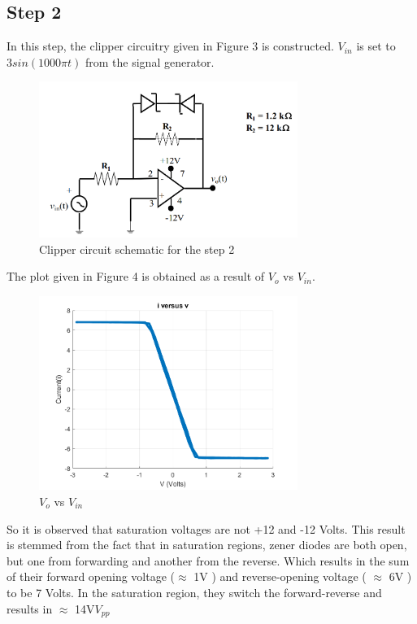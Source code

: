 \documentclass[letterpaper,12pt]{article}
\begin{document}
\subsection{Step 2}
In this step, the clipper circuitry given in Figure 3 is constructed. \(V_{in}\) is set to \(3 sin (1000\pi t)\) from the signal generator.
\begin{figure}[H]
    \centering
    \includegraphics[width = 0.75\textwidth]{2SCH.png}
    \caption{Clipper circuit schematic for the step 2}
\end{figure} 
The plot given in Figure 4 is obtained as a result of \(V_o\) vs \(V_{in}\).
\begin{figure}[H]
    \centering
    \includegraphics[width = 0.75\textwidth]{2.png}
    \caption{\(V_o\) vs \(V_{in}\)}
\end{figure} 
So it is observed that saturation voltages are not +12 and -12 Volts. This result is stemmed from the fact that in saturation regions, zener diodes are both open, but one from forwarding and another from the reverse. Which results in the sum of their forward opening voltage (\(\approx\)  1V ) and reverse-opening voltage ( \( \approx \) 6V ) to be 7 Volts. In the saturation region, they switch the forward-reverse and results in \( \approx\) 14V\(V_{pp}\)
\end{document}
